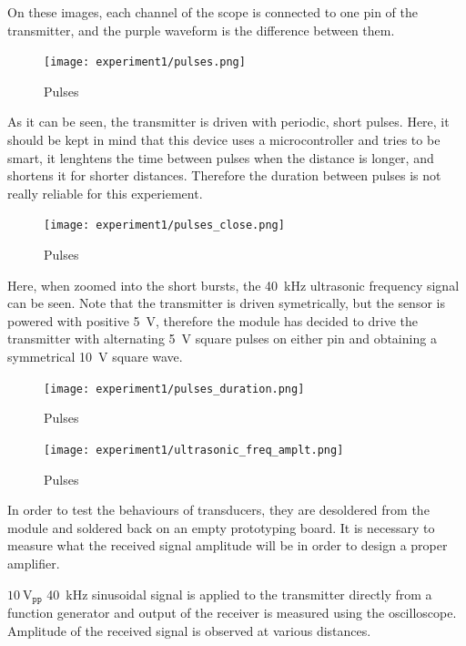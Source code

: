 \documentclass[12pt, a4paper]{article}
\begin{document}
        \noindent On these images, each channel of the scope is connected to one pin of the transmitter, and the purple waveform is the difference between them.

        \begin{figure}[H]\centering
            \texttt{[image: experiment1/pulses.png]}
            \caption[]{Pulses}\label{fig:pulses}
        \end{figure}

        \noindent As it can be seen, the transmitter is driven with periodic, short pulses. Here, it should be kept in mind that this device uses a microcontroller and tries to be smart, it lenghtens the time between pulses when the distance is longer, and shortens it for shorter distances. Therefore the duration between pulses is not really reliable for this experiement. 

        \begin{figure}[H]\centering
            \texttt{[image: experiment1/pulses\_close.png]}
            \caption[]{Pulses}\label{fig:pulses}
        \end{figure}

        \noindent Here, when zoomed into the short bursts, the \SI{40}{\kilo\hertz} ultrasonic frequency signal can be seen. Note that the transmitter is driven symetrically, but the sensor is powered with positive \SI{5}{\volt}, therefore the module has decided to drive the transmitter with alternating \SI{5}{\volt} square pulses on either pin and obtaining a symmetrical \SI{10}{\volt} square wave. 

        \begin{figure}[H]\centering
            \texttt{[image: experiment1/pulses\_duration.png]}
            \caption[]{Pulses}\label{fig:pulses}
        \end{figure}

        \begin{figure}[H]\centering
            \texttt{[image: experiment1/ultrasonic\_freq\_amplt.png]}
            \caption[]{Pulses}\label{fig:pulses}
        \end{figure}



        \pagebreak
        In order to test the behaviours of transducers, they are desoldered from the module and soldered back on an empty prototyping board. It is necessary to measure what the received signal amplitude will be in order to design a proper amplifier.

        $\SI{10}{\volt}_{\texttt{pp}}$ \SI{40}{\kilo\hertz} sinusoidal signal is applied to the transmitter directly from a function generator and output of the receiver is measured using the oscilloscope. Amplitude of the received signal is observed at various distances. 
\end{document}
